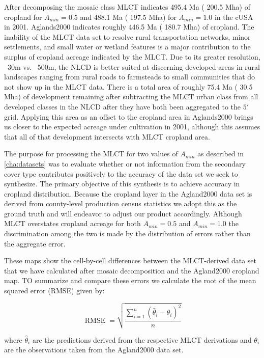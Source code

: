 After decomposing the mosaic class MLCT indicates
495.4 Ma ( 200.5 Mha) of cropland for
$A_{min}=0.5$ and 488.1 Ma ( 197.5 Mha) for
$A_{min}=1.0$ in the cUSA in 2001.  Aglands2000 indicates roughly
446.5 Ma ( 180.7 Mha) of cropland.  The
inability of the MLCT data set to resolve rural transportation
networks, minor settlements, and small water or wetland features is a
major contribution to the surplus of cropland acreage indicated by the
MLCT.  Due to its greater resolution, ~30m vs. ~500m, the NLCD is
better suited at discerning developed areas in rural landscapes
ranging from rural roads to farmsteads to small communities that do
not show up in the MLCT data. There is a total area of roughly
75.4 Ma ( 30.5 Mha)
of development remaining after subtracting the MLCT urban class from
all developed classes in the NLCD after they have both been aggregated
to the $5'$ grid. Applying this area as an offset to the cropland
area in Aglands2000 brings us closer to the expected acreage under
cultivation in 2001, although this assumes that all of that
development intersects with MLCT cropland area.

The purpose for processing the MLCT for two values of $A_{min}$ as
described in \autoref{cha:datasets} was to evaluate whether or not
information from the secondary cover type contributes positively to
the accuracy of the data set we seek to synthesize.  The primary
objective of this synthesis is to achieve accuracy in cropland
distribution.  Because the cropland layer in the Agland2000 data set
is derived from county-level production census statistics we adopt
this as the ground truth and will endeavor to adjust our product
accordingly.  Although MLCT overstates cropland acreage for both
$A_{min}=0.5$ and $A_{min}=1.0$ the discrimination among the two is made
by the distribution of errors rather than the aggregate error.


These maps show the cell-by-cell differences between the MLCT-derived
data set that we have calculated after mosaic decomposition and the
Agland2000 cropland map.  TO summarize and compare these errors we
calculate the root of the mean squared error (RMSE) given by:

$$
\operatorname{RMSE}=\sqrt{\frac{\sum_{i=1}^{n}(\hat\theta_i-\theta_i )^2}{n}}
$$

where $\hat\theta_i$ are the predictions derived from the respective
MLCT derivations and $\theta_i$ are the observations taken from the
Agland2000 data set.



